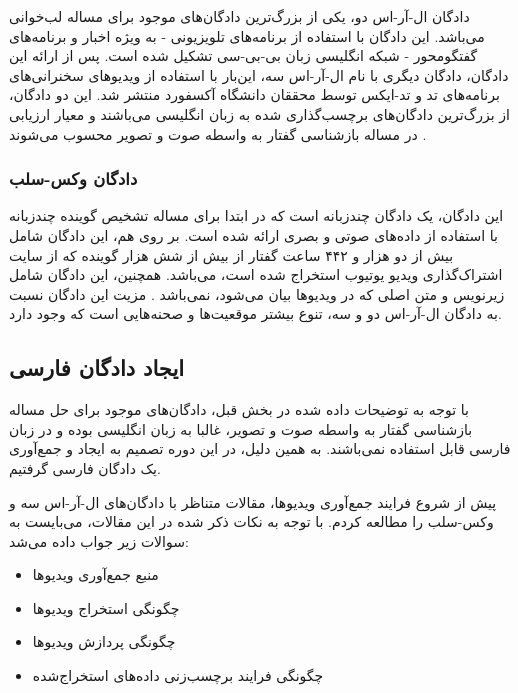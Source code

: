دادگان ال-آر-اس دو، یکی از بزرگ‌ترین دادگان‌های موجود برای مساله لب‌خوانی می‌باشد. این دادگان با استفاده از برنامه‌های تلویزیونی - به ویژه اخبار و برنامه‌های گفتگومحور
- شبکه انگلیسی زبان بی-بی-سی
تشکیل شده است. پس از ارائه این دادگان، دادگان دیگری با نام ال-آر-اس سه، این‌بار با استفاده از ویدیو‌های سخنرانی‌های برنامه‌های تد
و تد-ایکس
توسط محققان دانشگاه آکسفورد
منتشر شد. این دو دادگان، از بزرگ‌ترین دادگان‌های برچسب‌گذاری شده به زبان انگلیسی می‌باشند و معیار ارزیابی
در مساله بازشناسی گفتار به واسطه صوت و تصویر محسوب می‌شوند
\cite{shi2022learning}
.

\subsubsection{دادگان وکس-سلب}

 این دادگان، یک دادگان چند‌زبانه است که در ابتدا برای مساله تشخیص گوینده چندزبانه با استفاده از داده‌های صوتی و بصری ارائه شده است. بر روی هم، این دادگان شامل بیش از دو هزار و ۴۴۲ ساعت گفتار از بیش از شش هزار گوینده که از سایت اشتراک‌گذاری ویدیو یوتیوب
استخراج شده است، می‌باشد. همچنین، این دادگان شامل زیرنویس و متن اصلی که در ویدیو‌ها بیان می‌شود، نمی‌باشد
\cite{shi2022learning}
. مزیت این دادگان نسبت به دادگان ال-آر-اس دو و سه، تنوع بیشتر موقعیت‌ها و صحنه‌هایی است که وجود دارد. 
 
\subsection{ایجاد دادگان فارسی}

با توجه به توضیحات داده شده در بخش قبل، دادگان‌های موجود برای حل مساله بازشناسی گفتار به واسطه صوت و تصویر، غالبا به زبان انگلیسی بوده و در زبان فارسی قابل استفاده نمی‌باشند. به همین دلیل، در این دوره تصمیم به ایجاد و جمع‌آوری یک دادگان فارسی گرفتیم.

پیش از شروع فرایند جمع‌آوری ویدیو‌ها، مقالات متناظر با دادگان‌های ال-آر-اس سه و وکس-سلب را مطالعه کردم. با توجه به نکات ذکر شده در این مقالات، می‌بایست به سوالات زیر جواب داده می‌شد:

\begin{itemize}
	\item منبع جمع‌آوری ویدیو‌ها
	\item چگونگی استخراج ویدیو‌ها
	\item چگونگی پردازش ویدیو‌ها
	\item چگونگی فرایند برچسب‌زنی داده‌های استخراج‌شده
\end{itemize}

